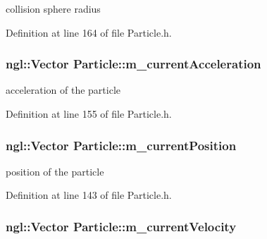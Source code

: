 collision sphere radius 



Definition at line 164 of file Particle.h.

\hypertarget{class_particle_adc620b3f6a45d397f0a674eef75cee84}{
\subsubsection[{m\_\-currentAcceleration}]{\setlength{\rightskip}{0pt plus 5cm}ngl::Vector {\bf Particle::m\_\-currentAcceleration}}}
\label{class_particle_adc620b3f6a45d397f0a674eef75cee84}


acceleration of the particle 



Definition at line 155 of file Particle.h.

\hypertarget{class_particle_aac033d4c7197975a3ed76dba63108475}{
\subsubsection[{m\_\-currentPosition}]{\setlength{\rightskip}{0pt plus 5cm}ngl::Vector {\bf Particle::m\_\-currentPosition}}}
\label{class_particle_aac033d4c7197975a3ed76dba63108475}


position of the particle 



Definition at line 143 of file Particle.h.

\hypertarget{class_particle_a00a3cb9ed10bf70c3a4e20f631ef7b0a}{
\subsubsection[{m\_\-currentVelocity}]{\setlength{\rightskip}{0pt plus 5cm}ngl::Vector {\bf Particle::m\_\-currentVelocity}}}
\label{class_particle_a00a3cb9ed10bf70c3a4e20f631ef7b0a}


